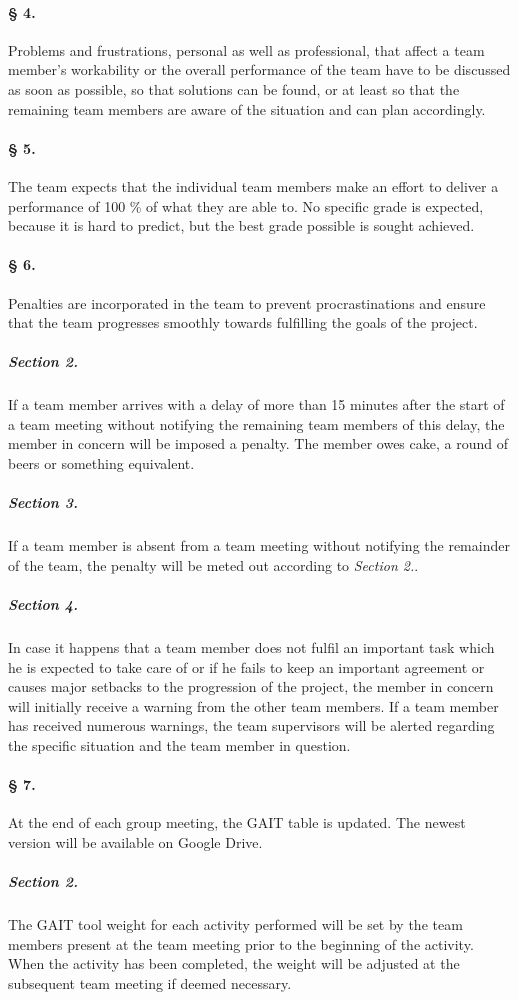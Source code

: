 \paragraph{§ 4.}
Problems and frustrations, personal as well as professional, that affect a team member’s workability or the overall performance of the team have to be discussed as soon as possible, so that solutions can be found, or at least so that the remaining team members are aware of the situation and can plan accordingly. 
\paragraph{§ 5.}
The team expects that the individual team members make an effort to deliver a performance of 100 \% of what they are able to. No specific grade is expected, because it is hard to predict, but the best grade possible is sought achieved.
\newline
\paragraph{§ 6.}
Penalties are incorporated in the team to prevent procrastinations and ensure that the team progresses smoothly towards fulfilling the goals of the project. 
\subparagraph{Section 2.}
If a team member arrives with a delay of more than 15 minutes after the start of a team meeting without notifying the remaining team members of this delay, the member in concern will be imposed a penalty. The member owes cake, a round of beers or something equivalent.
\subparagraph{Section 3.}
If a team member is absent from a team meeting without notifying the remainder of the team, the penalty will be meted out according to \textit{Section 2.}.
\subparagraph{Section 4.}
In case it happens that a team member does not fulfil an important task which he is expected to take care of or if he fails to keep an important agreement or causes major setbacks to the progression of the project, the member in concern will initially receive a warning from the other team members. If a team member has received numerous warnings, the team supervisors will be alerted regarding the specific situation and the team member in question.
\paragraph{§ 7.}
At the end of each group meeting, the GAIT table is updated. The newest version will be available on Google Drive. 
\subparagraph{Section 2.}
The GAIT tool weight for each activity performed will be set by the team members present at the team meeting prior to the beginning of the activity. When the activity has been completed, the weight will be adjusted at the subsequent team meeting if deemed necessary.
